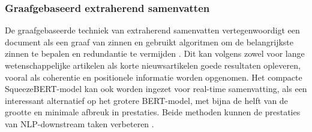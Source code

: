 
\subsubsection{Graafgebaseerd extraherend samenvatten}

De graafgebaseerde techniek van extraherend samenvatten vertegenwoordigt een document als een graaf van zinnen en gebruikt algoritmen om de belangrijkste zinnen te bepalen en redundantie te vermijden \autocite{Parveen2015}. Dit kan volgens \textcite{Parveen2015} zowel voor lange wetenschappelijke artikelen als korte nieuwsartikelen goede resultaten opleveren, vooral als coherentie en positionele informatie worden opgenomen. Het compacte SqueezeBERT-model kan ook worden ingezet voor real-time samenvatting, als een interessant alternatief op het grotere BERT-model, met bijna de helft van de grootte en minimale afbreuk in prestaties. Beide methoden kunnen de prestaties van NLP-downstream taken verbeteren \autocite{AbdelSalam2022}.


